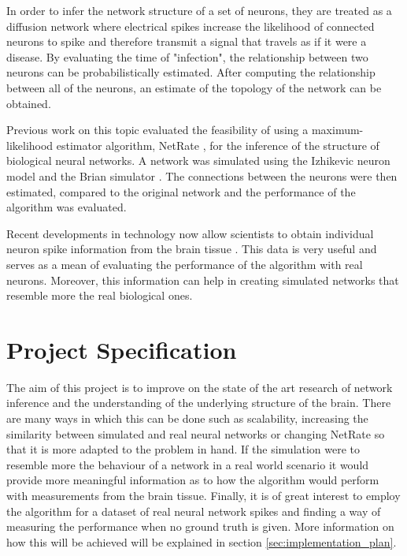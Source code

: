 \documentclass[11pt]{article}
\begin{document}
In order to infer the network structure of a set of neurons, they are treated as a diffusion network where electrical spikes increase the likelihood of connected neurons to spike and therefore transmit a signal that travels as if it were a disease. By evaluating the time of "infection", the relationship between two neurons can be probabilistically estimated. After computing the relationship between all of the neurons, an estimate of the topology of the network can be obtained. 

Previous work on this topic \cite{pranav_report, alexandru2018estimating} evaluated the feasibility of using a maximum-likelihood estimator algorithm, NetRate \cite{rodriguez2011uncovering}, for the inference of the structure of biological neural networks. A network was simulated using the Izhikevic neuron model \cite{izhikevich2003simple} and the Brian simulator \cite{10.3389/neuro.01.026.2009}. The connections between the neurons were then estimated, compared to the original network and the performance of the algorithm was evaluated.

Recent developments in technology now allow scientists to obtain individual neuron spike information from the brain tissue \cite{ito2016spontaneous, ito2014large, litke2004does}. This data is very useful and serves as a mean of evaluating the performance of the algorithm with real neurons. Moreover, this information can help in creating simulated networks that resemble more the real biological ones.

\section{Project Specification}


The aim of this project is to improve on the state of the art research of network inference and the understanding of the underlying structure of the brain. There are many ways in which this can be done such as scalability, increasing the similarity between simulated and real neural networks or changing NetRate so that it is more adapted to the problem in hand. If the simulation were to resemble more the behaviour of a network in a real world scenario it would provide more meaningful information as to how the algorithm would perform with measurements from the brain tissue. Finally, it is of great interest to employ the algorithm for a dataset of real neural network spikes and finding a way of measuring the performance when no ground truth is given. More information on how this will be achieved will be explained in section \ref{sec:implementation_plan}.
\end{document}
